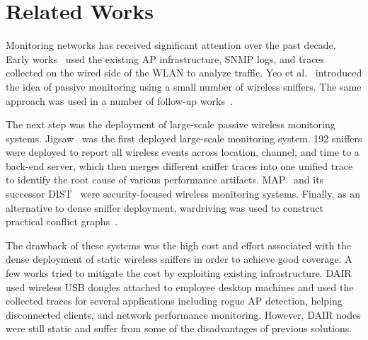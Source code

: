 \section{Related Works}
\label{sec:related}

Monitoring \wifi{} networks has received significant attention over the past
decade. Early works~\cite{chen:mccr2010,
henderson:mobicom2004,meng:mobicom2004,schwab:infocom2004} used the existing AP
infrastructure, SNMP logs, and traces collected on the wired side of the WLAN to
analyze \wifi{} traffic. Yeo et al.~\cite{yeo-wise04,yeo:witmemo2005} introduced
the idea of passive monitoring using a small number of wireless sniffers. The
same approach was used in a number of follow-up works~\cite{jardosh:imc2005,
jardosh:wind2005}.

The next step was the deployment of large-scale passive wireless monitoring
systems. Jigsaw~\cite{jigsaw-sigcomm06,jigsaw-sigcomm07} was the first deployed
large-scale monitoring system. 192 sniffers were deployed to report all wireless
events across location, channel, and time to a back-end server, which then
merges different sniffer traces into one unified trace to identify the root
cause of various performance artifacts. MAP~\cite{sheng:wicom2008} and its
successor DIST~\cite{tan:tmc2014} were security-focused wireless monitoring
systems. Finally, as an alternative to dense sniffer deployment, wardriving was
used to construct practical conflict graphs~\cite{zhou:sigmetrics2013}.

The drawback of these systems was the high cost and effort associated with the
dense deployment of static wireless sniffers in order to achieve good coverage.
A few works tried to mitigate the cost by exploiting existing infrastructure.
DAIR~\cite{bahl2006enhancing,chan:nsdi2006} used wireless USB dongles attached
to employee desktop machines and used the collected traces for several
applications including rogue AP detection, helping disconnected clients, and
network performance monitoring. However, DAIR nodes were still static and suffer
from some of the disadvantages of previous solutions.

